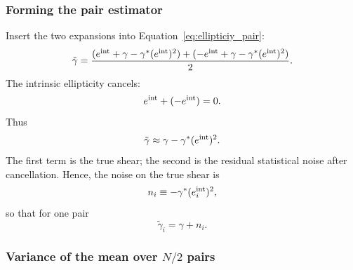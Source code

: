 \documentclass[11pt]{EuclidVIS}
\numberwithin{table}{section}
\numberwithin{figure}{section}
\begin{document}
\subsubsection{Forming the pair estimator}
Insert the two expansions into Equation~\eqref{eq:ellipticiy_pair}:
\begin{equation}
\tilde{\gamma}
    =
    \frac{
        (e^{\rm int} + \gamma - \gamma^\ast (e^{\rm int})^2)
        +
        (- e^{\rm int} + \gamma - \gamma^\ast (e^{\rm int})^2)
    }{2}.
\end{equation}
The intrinsic ellipticity cancels:
\begin{equation}
e^{\rm int} + (-e^{\rm int}) = 0.
\end{equation}
Thus
\begin{equation}
\tilde{\gamma}
    \approx 
    \gamma
    - \gamma^\ast (e^{\rm int})^2.
\label{eq:gamma_tilde}
\end{equation}
The first term is the true shear;  
the second is the residual statistical noise after cancellation. Hence, the
noise on the true shear is
\begin{equation}
n_i \equiv - \gamma^\ast (e_i^{\rm int})^2,
\end{equation}
so that for one pair
\begin{equation}
\tilde{\gamma}_i = \gamma + n_i.
\end{equation}

\subsubsection{Variance of the mean over $N/2$ pairs}
\end{document}
